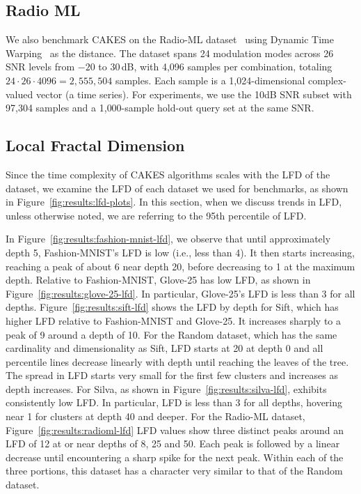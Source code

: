 \subsection{Radio ML}
\label{sec:datasets-and-benchmarks:radio-ml}

We also benchmark CAKES on the Radio-ML dataset~\cite{oshea2018radioml} using Dynamic Time Warping~\cite{muller2007dynamic} as the distance. The dataset spans 24 modulation modes across 26 SNR levels from $-20$ to $30$\,dB, with 4{,}096 samples per combination, totaling $24\!\cdot\!26\!\cdot\!4096=2{,}555{,}504$ samples. Each sample is a 1{,}024-dimensional complex-valued vector (a time series). For experiments, we use the 10dB SNR subset with 97{,}304 samples and a 1{,}000-sample hold-out query set at the same SNR.



\subsection{Local Fractal Dimension}
\label{sec:dayasets:lfd-of-datasets}


Since the time complexity of CAKES algorithms scales with the LFD of the dataset, we examine the LFD of each
dataset we used for benchmarks, as shown in Figure~\ref{fig:results:lfd-plots}. In this section, when we discuss trends in LFD, unless otherwise noted, we are referring to
the 95th percentile of LFD.

In Figure~\ref{fig:results:fashion-mnist-lfd}, we observe that until approximately depth 5, Fashion-MNIST’s LFD is low (i.e., less than 4). 
It then starts increasing, reaching a peak of about 6 near depth 20, before decreasing to 1 at the maximum depth.
Relative to Fashion-MNIST, Glove-25 has low LFD, as shown in Figure~\ref{fig:results:glove-25-lfd}. 
In particular, Glove-25’s LFD is less than 3 for all depths.
Figure~\ref{fig:results:sift-lfd} shows the LFD by depth for Sift, which has higher LFD relative to Fashion-MNIST and Glove-25. 
It increases sharply to a peak of 9 around a depth of 10.
For the Random dataset, which has the same cardinality and dimensionality as Sift, LFD starts at 20 at depth
0 and all percentile lines decrease linearly with depth until reaching the leaves of the tree. The spread in LFD starts very
small for the first few clusters and increases as depth increases. For Silva, as
shown in Figure~\ref{fig:results:silva-lfd}, exhibits consistently low LFD. In particular, LFD is less than 3 for all depths, hovering near 1 for
clusters at depth 40 and deeper. For the Radio-ML dataset, Figure~\ref{fig:results:radioml-lfd} LFD values show three distinct peaks around an LFD
of 12 at or near depths of 8, 25 and 50. Each peak is followed by a linear decrease until encountering a sharp spike for
the next peak. Within each of the three portions, this dataset has a character very similar to that of the Random dataset.

